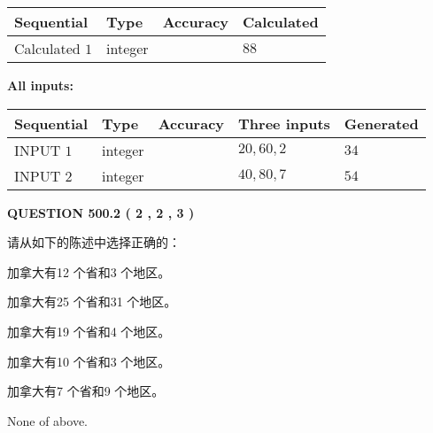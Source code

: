 \documentclass{ctexart}
\begin{document}
   
   
   
\noindent{}
   
   
  
  
\noindent\begin{tabular}{|l|l|l|l|}
\hline
 Sequential & Type & Accuracy & Calculated \\ 
\hline
 
 
  Calculated $  1 $ & integer &  & 
  $ 88 $ 
 \\  \hline  
 \end{tabular}
   
   
   
   
\noindent\vspace{0.1in}\hspace{-0.08in} {\textbf{\Large{All inputs: }}}
   
   
  
  
\noindent\begin{tabular}{|l|l|l|l|l|}
\hline
 Sequential & Type & Accuracy & Three inputs & Generated \\ 
\hline
 
 
  INPUT $  1 $ & integer &  & $
 20
 , 
 60
 , 
 2
 $ & $ 34 $ 
 \\  \hline  
 
 
  INPUT $  2 $ & integer &  & $
 40
 , 
 80
 , 
 7
 $ & $ 54 $ 
 \\  \hline  
 \end{tabular}
   
   
  
\vspace{0.2in}
  
{\textbf{\Large{QUESTION
500.2 
 ( 2 , 2 , 3 )
}}}
  
  
请从如下的陈述中选择正确的：
 
 
加拿大有12 个省和3 个地区。
 
 
加拿大有25 个省和31 个地区。
 
 
加拿大有19 个省和4 个地区。
 
 
加拿大有10 个省和3 个地区。
 
 
加拿大有7 个省和9 个地区。
 
 
 None of above.
 
 
\noindent{}
 
\end{document}
